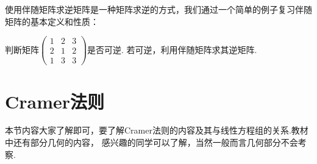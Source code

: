 使用伴随矩阵求逆矩阵是一种矩阵求逆的方式，我们通过一个简单的例子复习伴随矩阵的基本定义和性质：
\begin{example}
    判断矩阵$\begin{pmatrix}
        1 & 2 & 3 \\ 2 & 1 & 2 \\ 1 & 3 & 3
    \end{pmatrix}$是否可逆. 若可逆，利用伴随矩阵求其逆矩阵.
\end{example}

\section{Cramer法则}
本节内容大家了解即可，要了解Cramer法则的内容及其与线性方程组的关系.教材中还有部分几何的内容，
感兴趣的同学可以了解，当然一般而言几何部分不会考察.

